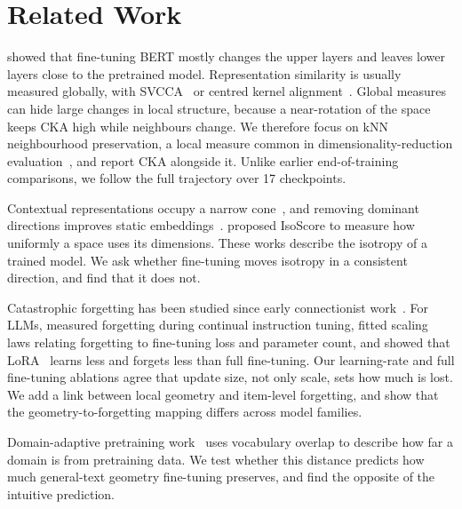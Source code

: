 \section{Related Work}
\label{sec:related}

 \citet{merchant2020happens} showed that fine-tuning BERT mostly changes the upper layers and leaves lower layers close to the pretrained model. Representation similarity is usually measured globally, with SVCCA~\citep{raghu2017svcca} or centred kernel alignment~\citep{kornblith2019similarity}. Global measures can hide large changes in local structure, because a near-rotation of the space keeps CKA high while neighbours change. We therefore focus on kNN neighbourhood preservation, a local measure common in dimensionality-reduction evaluation~\citep{venna2006local}, and report CKA alongside it. Unlike earlier end-of-training comparisons, we follow the full trajectory over 17 checkpoints.

 Contextual representations occupy a narrow cone~\citep{ethayarajh2019contextual}, and removing dominant directions improves static embeddings~\citep{mu2018allbutthetop}. \citet{rudman2022isoscore} proposed IsoScore to measure how uniformly a space uses its dimensions. These works describe the isotropy of a trained model. We ask whether fine-tuning moves isotropy in a consistent direction, and find that it does not.

 Catastrophic forgetting has been studied since early connectionist work~\citep{mccloskey1989catastrophic,kirkpatrick2017overcoming}. For LLMs, \citet{luo2023empirical} measured forgetting during continual instruction tuning, \citet{kalajdzievski2024scaling} fitted scaling laws relating forgetting to fine-tuning loss and parameter count, and \citet{biderman2024lora} showed that LoRA~\citep{hu2022lora} learns less and forgets less than full fine-tuning. Our learning-rate and full fine-tuning ablations agree that update size, not only scale, sets how much is lost. We add a link between local geometry and item-level forgetting, and show that the geometry-to-forgetting mapping differs across model families.

 Domain-adaptive pretraining work~\citep{gururangan2020dont} uses vocabulary overlap to describe how far a domain is from pretraining data. We test whether this distance predicts how much general-text geometry fine-tuning preserves, and find the opposite of the intuitive prediction.
